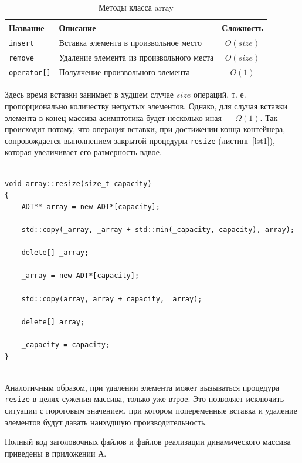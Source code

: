 \documentclass[a4paper,12pt]{article}
\begin{document}
\begin{table}[H]
	\caption{Методы класса array}
	\begin{center}
		\begin{tabular}{|l|l|c|}\hline\label{comp1}
			Название & Описание & Сложность \\ \hline
			\verb!insert! & Вставка элемента в произвольное место & $O(size)$ \\ \hline
			\verb!remove! & Удаление элемента из произвольного места & $O(size)$ \\ \hline
			\verb!operator[]! & Полулчение произвольного элемента & $O(1)$ \\ \hline
		\end{tabular}
	\end{center}
\end{table}

Здесь время вставки занимает в худшем случае $size$ операций, т. е. пропорционально количеству непустых элементов.
Однако, для случая вставки элемента в конец массива асимптотика будет несколько иная — $\Omega(1)$.
Так происходит потому, что операция вставки, при достижении конца контейнера, сопровождается выполнением закрытой процедуры \verb!resize! (листинг \ref{lst1}), которая увеличивает его размерность вдвое.

\begin{lstlisting}[caption={Процедура {\tt resize}},label=lst1]
	
void array::resize(size_t capacity)
{
	ADT** array = new ADT*[capacity];
	
	std::copy(_array, _array + std::min(_capacity, capacity), array);
	
	delete[] _array;
	
	_array = new ADT*[capacity];
	
	std::copy(array, array + capacity, _array);
	
	delete[] array;
	
	_capacity = capacity;
}
	
\end{lstlisting}

Аналогичным образом, при удалении элемента может вызываться процедура \verb!resize! в целях сужения массива, только уже втрое.
Это позволяет исключить ситуации с пороговым значением, при котором попеременные вставка и удаление элементов будут давать наихудшую производительность.

Полный код заголовочных файлов и файлов реализации динамического массива приведены в приложении А.
\end{document}
